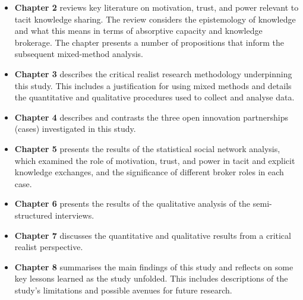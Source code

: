 \begin{itemize}[leftmargin=0pt]
\item[] \textbf{Chapter 2} reviews key literature on motivation, trust, and power relevant to tacit knowledge sharing. The review considers the epistemology of knowledge and what this means in terms of absorptive capacity and knowledge brokerage. The chapter presents a number of propositions that inform the subsequent mixed-method analysis. 
\item[] \textbf{Chapter 3} describes the critical realist research methodology underpinning this study. This includes a justification for using mixed methods and details the quantitative and qualitative procedures used to collect and analyse data.
\item[] \textbf{Chapter 4} describes and contrasts the three open innovation partnerships (cases) investigated in this study.
\item[] \textbf{Chapter 5} presents the results of the statistical social network analysis, which examined the role of motivation, trust, and power in tacit and explicit knowledge exchanges, and the significance of different broker roles in each case.
\item[] \textbf{Chapter 6} presents the results of the qualitative analysis of the semi-structured interviews.
\item[] \textbf{Chapter 7} discusses the quantitative and qualitative results from a critical realist perspective. 
\item[] \textbf{Chapter 8} summarises the main findings of this study and reflects on some key lessons learned as the study unfolded. This includes descriptions of the study's limitations and possible avenues for future research. 
\end{itemize}